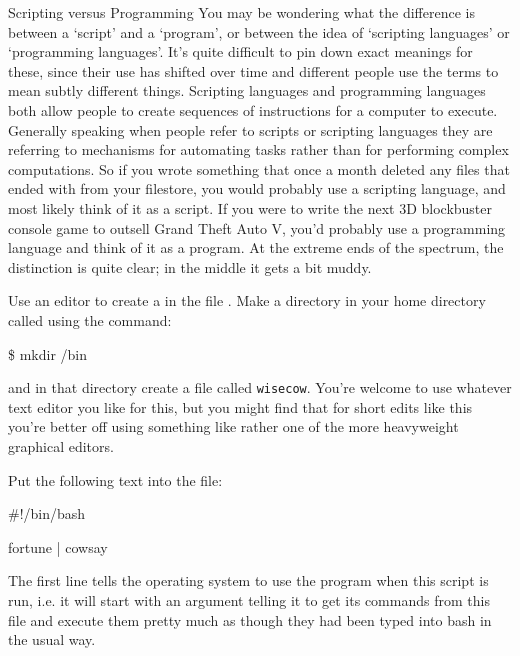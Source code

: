 \begin{diversion}{Scripting versus Programming}
You may be wondering what the difference is between a `script' and a `program', or between the idea of `scripting languages' or `programming languages'. It's quite difficult to pin down exact meanings for these, since their use has shifted over time and different people use the terms to mean subtly different things. Scripting languages and programming languages both allow people to create sequences of instructions for a computer to execute. Generally speaking when people refer to scripts or scripting languages they are referring to mechanisms for automating tasks rather than for performing complex computations. So if you wrote something that once a month deleted any files that ended with  from your filestore, you would probably use a scripting language, and most likely think of it as a script. If you were to write the next 3D blockbuster console game to outsell Grand Theft Auto V, you'd probably use a programming language and think of it as a program. At the extreme ends of the spectrum, the distinction is quite clear; in the middle it gets a bit muddy.
\end{diversion}


Use an editor to create a  in the file
. Make a directory in your home directory called  using the command:

\begin{ttoutenv}
\$ mkdir \tilde/bin
\end{ttoutenv}

and in that directory create a file called \texttt{wisecow}. You're welcome to use whatever text editor you like for this, but you might find that for short edits like this you're better off using something like  rather one of the more heavyweight graphical editors. 

Put the following text into the file:

\begin{ttoutenv}
#!/bin/bash

fortune | cowsay
\end{ttoutenv}

The first line tells the operating system to use the program 
when this script is run, i.e. it will start  with an argument
telling it to get its commands from this file and execute them pretty much as
though they had been typed into bash in the usual way.

